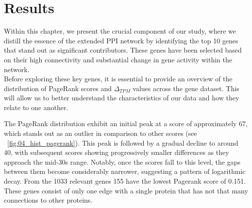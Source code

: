 \section{Results} \label{sec:results}

Within this chapter, we present the crucial component of our study,
where we distill the essence of the extended PPI network by identifying the top 10 genes that stand out as significant contributors.
These genes have been selected based on their high connectivity and substantial change in gene activity within the network.\\

Before exploring these key genes,
it is essential to provide an overview of the distribution of PageRank scores and $\Delta_{TPM}$ values across the gene dataset.
This will allow us to better understand the characteristics of our data and how they relate to one another.

The PageRank distribution exhibit an initial peak at a score of approximately 67,
which stands out as an outlier in comparison to other scores (see ~\cref{fig:04_hist_pagerank}).
This peak is followed by a gradual decline to around 40, with subsequent scores showing progressively smaller differences
as they approach the mid-30s range.
Notably, once the scores fall to this level, the gaps between them become considerably narrower,
suggesting a pattern of logarithmic decay.
From the 1033 relevant genes 155 have the lowest Pagerank score of 0.151.
These genes consist of only one edge with a single protein that has not that many connections to other proteins.\\


